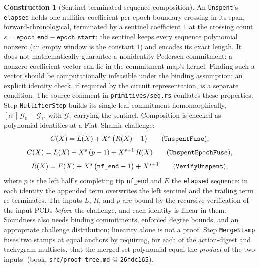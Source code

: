 \documentclass[11pt,a4paper]{article}
\theoremstyle{definition}
\newtheorem{construction}[theorem]{Construction}
\newcommand{\nfsym}{\mathsf{nf}}
\begin{document}
\begin{construction}[Sentinel-terminated sequence composition]
\label{def:tachyon-design-splice}
An \texttt{Unspent}'s \texttt{elapsed} holds one nullifier coefficient per
epoch-boundary crossing in its span, forward-chronological, terminated by a
sentinel coefficient $1$ at the crossing count
$s = \texttt{epoch\_end} - \texttt{epoch\_start}$; the sentinel keeps every
sequence polynomial nonzero (an empty window is the constant $1$) and
encodes its exact length. It does not mathematically guarantee a
nonidentity Pedersen commitment: a nonzero coefficient vector can lie
in the commitment map's kernel. Finding such a vector should be
computationally infeasible under the binding assumption; an explicit
identity check, if required by the circuit representation, is a separate
condition. The source comment in \texttt{primitives/seq.rs} conflates
these properties. Step \texttt{NullifierStep} builds its single-leaf commitment
homomorphically, $[\nfsym]\,\mathcal{G}_0 + \mathcal{G}_1$, with
$\mathcal{G}_1$ carrying the sentinel. Composition is checked as polynomial
identities at a Fiat--Shamir challenge:
\[
C(X) = L(X) + X^{s}\,\bigl(R(X) - 1\bigr)
\qquad \text{(\texttt{UnspentFuse}),}
\]
\[
C(X) = L(X) + X^{s}\,(p - 1) + X^{s+1}\,R(X)
\qquad \text{(\texttt{UnspentEpochFuse}),}
\]
\[
R(X) = E(X) + X^{s}\,\bigl(\texttt{nf\_end} - 1\bigr) + X^{s+1}
\qquad \text{(\texttt{VerifyUnspent}),}
\]
where $p$ is the left half's completing tip \texttt{nf\_end} and $E$ the
\texttt{elapsed} sequence: in each identity the appended term overwrites
the left sentinel and the trailing term re-terminates. The inputs $L$,
$R$, and $p$ are bound by the recursive verification of the input PCDs
\emph{before} the challenge, and each identity is linear in them. Soundness
also needs binding commitments, enforced degree bounds, and an appropriate
challenge distribution; linearity alone is not a proof. Step
\texttt{MergeStamp} fuses two stamps at
equal anchors by requiring, for each of the action-digest and tachygram
multisets, that the merged set polynomial equal the \emph{product} of the
two inputs' (book, \texttt{src/proof-tree.md} @ \texttt{26fdc165}).
\end{construction}
\end{document}
